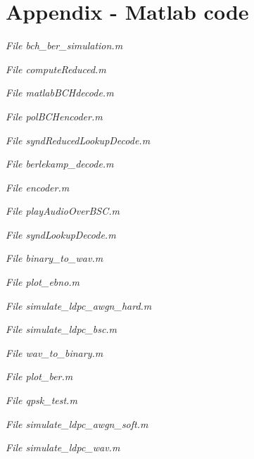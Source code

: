 \documentclass[a4paper]{article}
\begin{document}



\hfill
\newpage

\part*{Appendix - Matlab code}

\textit{File bch\_ber\_simulation.m} 

\textit{File computeReduced.m} 
 
\textit{File matlabBCHdecode.m} 
 
\textit{File polBCHencoder.m} 
 
\textit{File syndReducedLookupDecode.m} 

\textit{File berlekamp\_decode.m} 
 
\textit{File encoder.m} 
 
\textit{File playAudioOverBSC.m} 
 
\textit{File syndLookupDecode.m} 

\textit{File binary\_to\_wav.m} 

\textit{File plot\_ebno.m } 
 
\textit{File simulate\_ldpc\_awgn\_hard.m} 
 
\textit{File simulate\_ldpc\_bsc.m} 
 
\textit{File wav\_to\_binary.m} 

\textit{File plot\_ber.m } 
 
\textit{File qpsk\_test.m} 
 
\textit{File simulate\_ldpc\_awgn\_soft.m } 
 
\textit{File simulate\_ldpc\_wav.m} 

\end{document}
